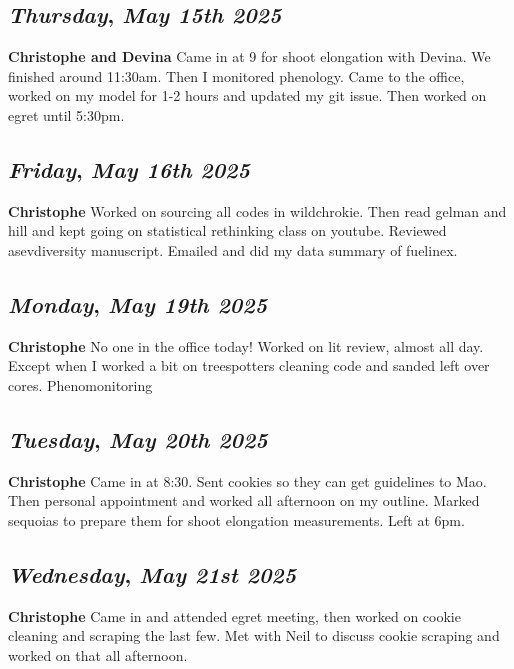 \def\day{\textit{May 15th 2025}}
\def\weekday{\textit{Thursday}}
\subsection*{\weekday, \day}
\textbf {Christophe and Devina}
Came in at 9 for shoot elongation with Devina. We finished around 11:30am. Then I monitored phenology. Came to the office, worked on my model for 1-2 hours and updated my git issue. Then worked on egret until 5:30pm.

\def\day{\textit{May 16th 2025}}
\def\weekday{\textit{Friday}}
\subsection*{\weekday, \day}
\textbf {Christophe}
Worked on sourcing all codes in wildchrokie. Then read gelman and hill and kept going on statistical rethinking class on youtube. Reviewed asevdiversity manuscript. Emailed and did my data summary of fuelinex. 

\def\day{\textit{May 19th 2025}}
\def\weekday{\textit{Monday}}
\subsection*{\weekday, \day}
\textbf {Christophe}
No one in the office today! Worked on lit review, almost all day. Except when I worked a bit on treespotters cleaning code and sanded left over cores. Phenomonitoring 

\def\day{\textit{May 20th 2025}}
\def\weekday{\textit{Tuesday}}
\subsection*{\weekday, \day}
\textbf {Christophe}
Came in at 8:30. Sent cookies so they can get guidelines to Mao. Then personal appointment and worked all afternoon on my outline. Marked sequoias to prepare them for shoot elongation measurements. Left at 6pm.

\def\day{\textit{May 21st 2025}}
\def\weekday{\textit{Wednesday}}
\subsection*{\weekday, \day}
\textbf {Christophe}
Came in and attended egret meeting, then worked on cookie cleaning and scraping the last few. Met with Neil to discuss cookie scraping and worked on that all afternoon.

\def\day{\textit{May 22nd 2025}}
\def\weekday{\textit{Thursday}}
